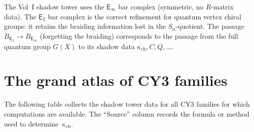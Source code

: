 \documentclass[11pt]{article}
\newcommand{\Etwo}{\mathsf{E}_2}
\newcommand{\Einf}{\mathsf{E}_{\infty}}
\begin{document}
\begin{remark}
The Vol~I shadow tower uses the $\Einf$ bar complex (symmetric, no $R$-matrix data). The $\Etwo$ bar complex is the correct refinement for quantum vertex chiral groups: it retains the braiding information lost in the $S_n$-quotient. The passage $B_{\Etwo} \to B_{\Einf}$ (forgetting the braiding) corresponds to the passage from the full quantum group $G(X)$ to its shadow data $\kappa_{\mathrm{ch}}, C, Q, \ldots$.
\end{remark}


\section{The grand atlas of CY3 families}
\label{wn:sec:grand-atlas}

The following table collects the shadow tower data for all CY3 families for which computations are available. The ``Source'' column records the formula or method used to determine~$\kappa_{\mathrm{ch}}$.
\end{document}
